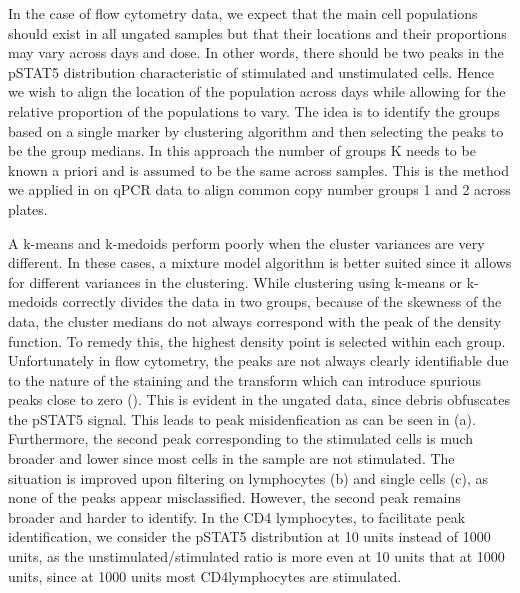 In the case of flow cytometry data, we expect that the main cell populations should exist in all ungated samples but that their locations and their
proportions may vary across days and  dose.
In other words, there should be two peaks in the pSTAT5 distribution characteristic of stimulated and unstimulated cells.
Hence we wish to align the location of the population across days while allowing for the relative proportion of the populations to vary.  
The idea is to identify the groups based on a single marker by clustering algorithm and then selecting the peaks to be the group medians.
In this approach the number of groups K needs to be known a priori and is assumed to be the same across samples.
This is the method we applied in  on qPCR data to align common copy number groups 1 and 2 across plates.

A k-means and k-medoids perform poorly when the cluster variances are very different.
In these cases, a mixture model algorithm is better suited since it allows for different variances in the clustering.
While clustering using k-means or k-medoids correctly divides the data in two groups, because of the skewness of the data, the cluster medians
do not always correspond with the peak of the density function.  To remedy this, the highest density point is selected within each group.
Unfortunately in flow cytometry, the peaks are not always clearly identifiable due to the nature of the staining and the transform which can introduce
spurious peaks close to zero ().
This is evident in the ungated data, since debris obfuscates the pSTAT5 signal.
This leads to peak misidenfication as can be seen in (a).
Furthermore, the second peak corresponding to the stimulated cells is much broader and lower since most cells in the sample are not stimulated.
The situation is improved upon filtering on lymphocytes (b) and single cells (c), as none of the peaks appear misclassified.
However, the second peak remains broader and harder to identify.
In the CD4 lymphocytes, to facilitate peak identification, we consider the pSTAT5 distribution at 10 units instead of 1000 units,
as the unstimulated/stimulated ratio is more even at 10 units that at 1000 units, since at 1000 units most CD4\positive lymphocytes are stimulated.

